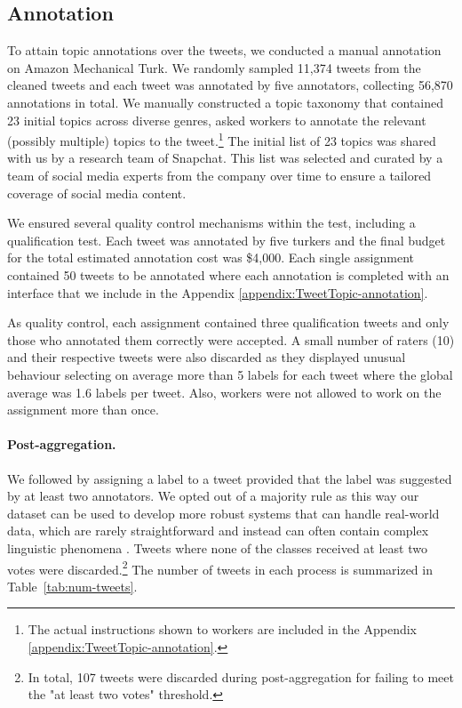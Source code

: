 \subsection{Annotation}
To attain topic annotations over the tweets, we conducted a manual annotation on Amazon Mechanical Turk.
We randomly sampled 11,374 tweets from the cleaned tweets and each tweet was annotated by five annotators, collecting 56,870 annotations in total. 
We manually constructed a topic taxonomy that contained 23 initial topics across diverse genres, asked workers to annotate the relevant (possibly multiple) topics to the tweet.\footnote{The actual instructions shown to workers are included in the Appendix \ref{appendix:TweetTopic-annotation}.} The initial list of 23 topics was shared with us by a research team of Snapchat. This list was selected and curated by a team of social media experts from the company over time to ensure a tailored coverage of social media content. 

We ensured several quality control mechanisms within the test, including a qualification test. Each tweet was annotated by five turkers and the final budget for the total estimated annotation cost was \$4,000.
Each single assignment contained 50 tweets to be annotated where each annotation is completed with an interface that we include in the Appendix \ref{appendix:TweetTopic-annotation}. 

As quality control, each assignment contained three qualification tweets and only those who annotated them correctly were accepted.
A small number of raters (10) and their respective tweets were also discarded as they displayed unusual behaviour selecting on average more than 5 labels for each tweet where the global average was 1.6 labels per tweet.
Also, workers were not allowed to work on the assignment more than once.

\paragraph{Post-aggregation.} 
We followed  by assigning a label to a tweet provided that the label was suggested by at least two annotators. %
We opted out of a majority rule as this way our dataset can be used to develop more robust systems that can handle real-world data, which are rarely straightforward and instead can often contain complex linguistic phenomena \cite{mohammad2018semeval}. Tweets where none of the classes received at least two votes were discarded.\footnote{In total, 107 tweets were discarded during post-aggregation for failing to meet the "at least two votes" threshold.} The number of tweets in each process is summarized in Table~\ref{tab:num-tweets}.

